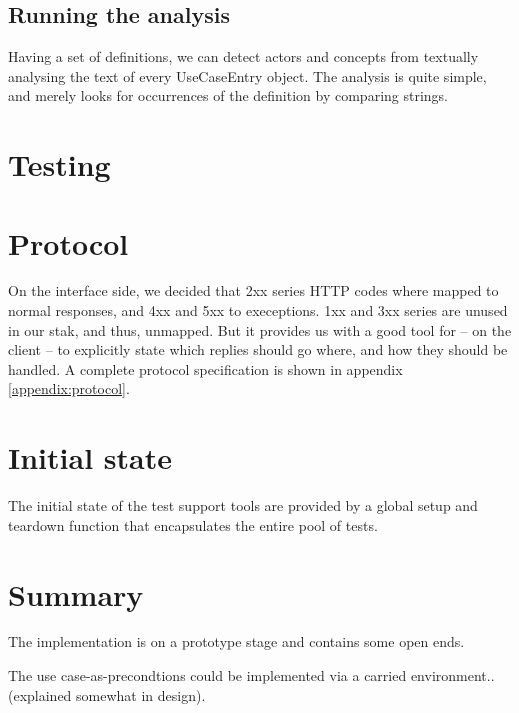 \subsection{Running the analysis}
Having a set of definitions, we can detect actors and concepts from textually analysing the text of every UseCaseEntry object. The analysis is quite simple, and merely looks for occurrences of the definition by comparing strings.


\section{Testing}

\section{Protocol}
On the interface side, we decided that 2xx series HTTP codes where mapped to normal responses, and 4xx and 5xx to execeptions. 1xx and 3xx series are unused in our stak, and thus, unmapped. But it provides us with a good tool for -- on the client -- to explicitly state which replies should go where, and how they should be handled. A complete protocol specification is shown in appendix \ref{appendix:protocol}.

\section{Initial state}
The initial state of the test support tools are provided by a global setup and teardown function that encapsulates the entire pool of tests.

\section{Summary}
The implementation is on a prototype stage and contains some open ends.

The use case-as-precondtions could be implemented via a carried environment.. (explained somewhat in design).
